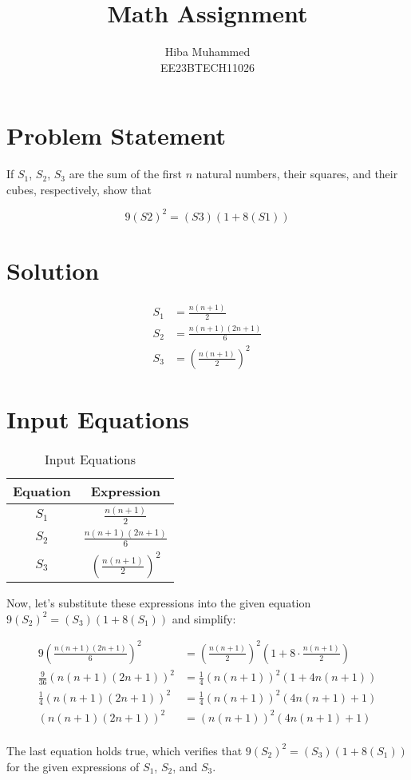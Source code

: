 \documentclass[12pt]{article}
\begin{document}
\title{Math Assignment}
\author{Hiba Muhammed \\
        EE23BTECH11026}
\maketitle

\section*{Problem Statement}
If \(S_1\), \(S_2\), \(S_3\) are the sum of the first \(n\) natural numbers, their squares, and their cubes, respectively, show that 

\[ 9(S\scriptstyle 2)^2 = (S\scriptstyle 3)(1 + 8(S\scriptstyle 1)) \]

\section*{Solution}

\begin{align*}
    S_1 &= \frac{n(n+1)}{2} \\
    S_2 &= \frac{n(n+1)(2n+1)}{6} \\
    S_3 &= \left(\frac{n(n+1)}{2}\right)^2
\end{align*}

\section*{Input Equations}

\begin{table}[h]
  \centering
  \caption{Input Equations}
  \label{tab:input-equations}
  \begin{tabular}{|c|c|}
    \hline
    \textbf{Equation} & \textbf{Expression} \\
    \hline
    \(S_1\) & $\frac{n(n+1)}{2}$ \\
    \(S_2\) & $\frac{n(n+1)(2n+1)}{6}$ \\
    \(S_3\) & $\left(\frac{n(n+1)}{2}\right)^2$ \\
    \hline
  \end{tabular}
\end{table}

Now, let's substitute these expressions into the given equation \(9(S_2)^2 = (S_3)(1 + 8(S_1))\) and simplify:

\begin{align*}
    9\left(\frac{n(n+1)(2n+1)}{6}\right)^2 &= \left(\frac{n(n+1)}{2}\right)^2 \left(1 + 8 \cdot \frac{n(n+1)}{2}\right) \\
    \frac{9}{36}\left(n(n+1)(2n+1)\right)^2 &= \frac{1}{4}\left(n(n+1)\right)^2 \left(1 + 4n(n+1)\right) \\
    \frac{1}{4}\left(n(n+1)(2n+1)\right)^2 &= \frac{1}{4}\left(n(n+1)\right)^2 \left(4n(n+1) + 1\right) \\
    \left(n(n+1)(2n+1)\right)^2 &= \left(n(n+1)\right)^2 \left(4n(n+1) + 1\right) \\
\end{align*}

The last equation holds true, which verifies that \(9(S_2)^2 = (S_3)(1 + 8(S_1))\) for the given expressions of \(S_1\), \(S_2\), and \(S_3\).
\end{document}
